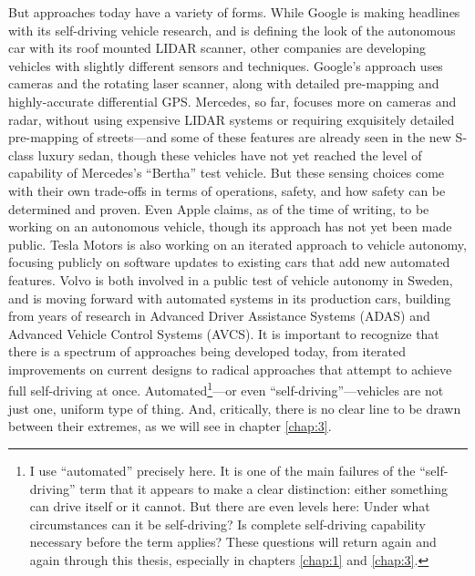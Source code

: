 But approaches today have a variety of forms. While Google is making
headlines with its self-driving vehicle research, and is defining the
look of the autonomous car with its roof mounted LIDAR scanner, other
companies are developing vehicles with slightly different sensors and
techniques. Google's approach uses cameras and the rotating laser
scanner, along with detailed pre-mapping and highly-accurate
differential GPS\cite{???}. Mercedes, so far, focuses more on cameras and radar,
without using expensive LIDAR systems or requiring exquisitely
detailed pre-mapping of streets---and some of these features are
already seen in the new S-class luxury sedan, though these vehicles
have not yet reached the level of capability of Mercedes's ``Bertha''
test vehicle\cite{???}. But these sensing choices come with their own
trade-offs in terms of operations, safety, and how safety can be
determined and proven. Even Apple claims, as of the time of writing,
to be working on an autonomous vehicle, though its approach has not
yet been made public. Tesla Motors is also working on an iterated
approach to vehicle autonomy, focusing publicly on software updates to
existing cars that add new automated features. Volvo is both involved
in a public test of vehicle autonomy in Sweden, and is moving forward
with automated systems in its production cars, building from years of
research in Advanced Driver Assistance Systems (ADAS) and Advanced
Vehicle Control Systems (AVCS). It is important to recognize that
there is a spectrum of approaches being developed today, from iterated
improvements on current designs to radical approaches that attempt to
achieve full self-driving at once. Automated\footnote{I use ``automated''
  precisely here. It is one of the main failures of the
  ``self-driving'' term that it appears to make a clear distinction: 
  either something can drive itself or it cannot. But there are even
  levels here: Under what circumstances can it be self-driving? Is
  complete self-driving capability necessary before the term applies?
  These questions will return again and again through this thesis,
  especially in chapters \ref{chap:1} and \ref{chap:3}. }---or even
``self-driving''---vehicles are not just one, uniform type of
thing. And, critically, there is no clear
line to be drawn between their extremes, as we will see in chapter
\ref{chap:3}. 




